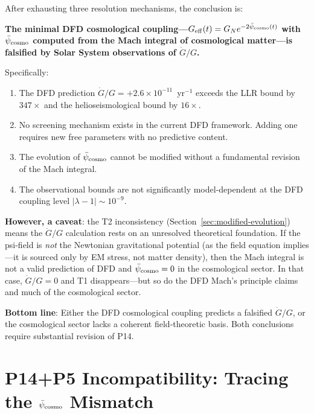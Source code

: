 \documentclass[11pt]{article}
\newcommand{\ee}[1]{\times 10^{#1}}
\newcommand{\psicosmo}{\bar{\psi}_{\rm cosmo}}
\begin{document}
\begin{tcolorbox}[colback=red!5!white, colframe=red!80!black,
  title=\textbf{T1 Verdict: Genuine Falsification of the DFD Minimal Cosmological Coupling}]
After exhausting three resolution mechanisms, the conclusion is:

\textbf{The minimal DFD cosmological coupling---$G_{\rm eff}(t) = G_N e^{-2\psicosmo(t)}$
with $\psicosmo$ computed from the Mach integral of cosmological matter---is
falsified by Solar System observations of $\dot{G}/G$.}

Specifically:
\begin{enumerate}
\item The DFD prediction $\dot{G}/G = +2.6\ee{-11}$~yr$^{-1}$ exceeds the
  LLR bound by $347\times$ and the helioseismological bound by $16\times$.
\item No screening mechanism exists in the current DFD framework. Adding
  one requires new free parameters with no predictive content.
\item The evolution of $\psicosmo$ cannot be modified without a fundamental
  revision of the Mach integral.
\item The observational bounds are not significantly model-dependent at the
  DFD coupling level $|\lambda-1| \sim 10^{-9}$.
\end{enumerate}

\textbf{However, a caveat}: the T2 inconsistency (Section~\ref{sec:modified-evolution})
means the $\dot{G}/G$ calculation rests on an unresolved theoretical foundation.
If the psi-field is \emph{not} the Newtonian gravitational potential (as the
field equation implies---it is sourced only by EM stress, not matter density),
then the Mach integral is not a valid prediction of DFD and $\psicosmo = 0$
in the cosmological sector. In that case, $\dot{G}/G = 0$ and T1 disappears---but
so do the DFD Mach's principle claims and much of the cosmological sector.

\textbf{Bottom line}: Either the DFD cosmological coupling predicts a falsified
$\dot{G}/G$, or the cosmological sector lacks a coherent field-theoretic basis.
Both conclusions require substantial revision of P14.
\end{tcolorbox}

\section{P14+P5 Incompatibility: Tracing the $\psicosmo$ Mismatch}
\label{sec:P14P5}
\end{document}
